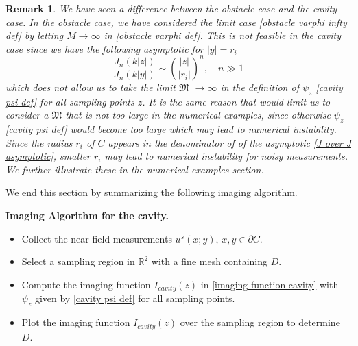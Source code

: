 \documentclass[final]{siamltex}
\newtheorem{remark}{Remark}
\begin{document}
\begin{remark}\label{Mchoise}
We have seen a difference between the obstacle case and the cavity case. In the obstacle case, we have considered the limit case \eqref{obstacle varphi infty def} by letting $M \to \infty$ in \eqref{obstacle varphi def}. This is not feasible in the cavity case since we have the following asymptotic for $|y|=r_i$
\begin{equation} \label{J over J asymptotic}
\frac{J_n(k|z|)}{J_n(k|y|)}\sim \left(\frac{|z|}{|r_i|}\right)^n, \quad n \gg 1
\end{equation}
which does not allow us to take the limit {\footnotesize $\mathfrak{M}$} $\to \infty$ in the definition of $\psi_z$ \eqref{cavity psi def} for all sampling points $z$. It is the same reason that would limit us to consider a {\footnotesize $\mathfrak{M}$} that is not too large in the numerical examples, since otherwise  $\psi_z$ \eqref{cavity psi def} would become too large which may lead to numerical instability. Since the radius $r_i$ of $C$ appears in the denominator of of the asymptotic \eqref{J over J asymptotic}, smaller $r_i$ may lead to numerical instability for noisy measurements. We further illustrate these in the numerical examples section.
\end{remark}


We end this section by summarizing the following imaging algorithm.

\vspace{0.5\baselineskip}

\noindent\textbf{Imaging Algorithm for the cavity.}
\
\begin{itemize}
\item Collect the  near field measurements $u^s(x;y), \,x,y \in \partial C$.
\item Select a sampling region in $\mathbb{R}^2$ with a fine mesh containing $D$.
\item Compute the imaging function $I_{cavity}(z)$ in \eqref{imaging function cavity} with $\psi_z$ given by \eqref{cavity psi def}  for all sampling points.
\item Plot the imaging function $I_{cavity}(z)$ over the sampling region  to determine $D$.
\end{itemize}


\end{document}
